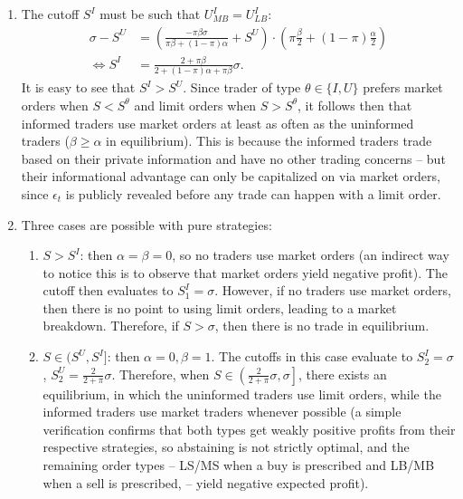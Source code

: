 \documentclass[a4paper]{article}
\begin{document}
\begin{enumerate}
	\item The cutoff $S^I$ must be such that $U^I_{MB} = U^I_{LB}$:
	\begin{align*}
		\sigma - S^U &= \left( \frac{-\pi \beta \sigma}{\pi \beta + (1-\pi) \alpha} + S^U \right) \cdot \left(\pi \frac{\beta}{2} + (1-\pi) \frac{\alpha}{2}\right)
		\\
		\iff 
		S^I &= \frac{2+\pi \beta}{2 + (1-\pi)\alpha + \pi \beta} \sigma.
	\end{align*}
	It is easy to see that $S^I > S^U$. Since trader of type $\theta \in \{I,U\}$ prefers market orders when $S < S^\theta$ and limit orders when $S > S^\theta$, it follows then that informed traders use market orders at least as often as the uninformed traders ($\beta \geq \alpha$ in equilibrium). This is because the informed traders trade based on their private information and have no other trading concerns -- but their informational advantage can only be capitalized on via market orders, since $\epsilon_t$ is publicly revealed before any trade can happen with a limit order.

	\item Three cases are possible with pure strategies:
	\begin{enumerate}
		\item $S > S^I$: then $\alpha=\beta=0$, so no traders use market orders (an indirect way to notice this is to observe that market orders yield negative profit). The cutoff then evaluates to $S^I_1 = \sigma$. However, if no traders use market orders, then there is no point to using limit orders, leading to a market breakdown. Therefore, if $S > \sigma$, then there is no trade in equilibrium.
		
		\item $S \in (S^U, S^I]$: then $\alpha=0,\beta=1$. The cutoffs in this case evaluate to $S^I_2 = \sigma$, $S^U_2 = \frac{2}{2+\pi} \sigma$. Therefore, when $S \in \left(\frac{2}{2+\pi} \sigma, \sigma\right]$, there exists an equilibrium, in which the uninformed traders use limit orders, while the informed traders use market traders whenever possible (a simple verification confirms that both types get weakly positive profits from their respective strategies, so abstaining is not strictly optimal, and the remaining order types -- LS/MS when a buy is prescribed and LB/MB when a sell is prescribed, -- yield negative expected profit).
		

\end{enumerate}
\end{enumerate}
\end{document}
